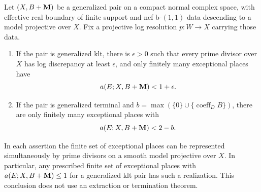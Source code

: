 \begin{lemma}\label{lem:low-places}
Let $(X,B+\mathbf M)$ be a generalized pair on a compact normal complex
space, with effective real boundary of finite support and nef
b-$(1,1)$ data descending to a model projective over $X$.  Fix a projective log resolution $p:W\to X$ carrying those data.
\begin{enumerate}[label=\textup{(\roman*)}]
\item If the pair is generalized klt, there is $\epsilon>0$ such that
every prime divisor over $X$ has log discrepancy at least $\epsilon$,
and only finitely many exceptional places have
\[
 a(E;X,B+\mathbf M)<1+\epsilon.
\]
\item If the pair is generalized terminal and
$b=\max(\{0\}\cup\{\operatorname{coeff}_D B\})$, there are only
finitely many exceptional places with
\[
 a(E;X,B+\mathbf M)<2-b.
\]
\end{enumerate}
In each assertion the finite set of exceptional places can be represented
simultaneously by prime divisors on a smooth model projective over $X$.
In particular, any prescribed finite set of exceptional places with
$a(E;X,B+\mathbf M)\leq 1$ for a generalized klt pair has such a realization.
This conclusion does not use an extraction or termination theorem.
\end{lemma}


